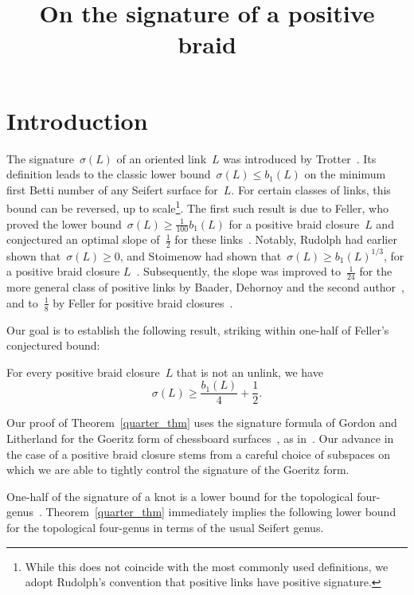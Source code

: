 \documentclass[AHL,Unicode,longabstracts,published]{cedram}
\title[On the signature of a positive braid]{On the signature of a positive braid}
\author[\initial{J. E.} \lastname{Greene}]{\firstname{Joshua Evan} \lastname{Greene}}
\author[\initial{L.} \lastname{Liechti}]{\firstname{Livio} \lastname{Liechti}}
\begin{document}
\maketitle

\section{Introduction}

The signature~$\sigma(L)$ of an oriented link~$L$ was introduced by Trotter~\cite{Trotter}. Its definition leads to the classic lower bound~$\sigma(L) \le b_1(L)$ on the minimum first Betti number of any Seifert surface for~$L$. For certain classes of links, this bound can be reversed, up to scale\footnote{While this does not coincide with the most commonly used definitions, we adopt Rudolph's convention that positive links have positive signature.}. The first such result is due to Feller, who proved the lower bound~$\sigma(L) \ge \frac{1}{100} b_1(L)$ for a positive braid closure~$L$ and conjectured an optimal slope of~$\frac12$ for these links~\cite{Peschito}. Notably, Rudolph had earlier shown that~$\sigma(L) \ge 0$, and Stoimenow had shown that~$\sigma(L) \ge b_1(L)^{1/3}$, for a positive braid closure $L$~\cite{Rudolph,Stoimenow}. Subsequently, the slope was improved to~$\frac{1}{24}$ for the more general class of positive links by Baader, Dehornoy and the second author~\cite{BDL}, and to~$\frac18$ by Feller for positive braid closures~\cite{Pegascito}.


Our goal is to establish the following result, striking within one-half of Feller's conjectured bound:

\begin{theo}\label{quarter_thm}
For every positive braid closure~$L$ that is not an unlink, we have
\[
\sigma(L)\ge \frac{b_1(L)}{4}+\frac{1}{2}.
\]
\end{theo}

Our proof of Theorem~\ref{quarter_thm} uses the signature formula of Gordon and Litherland for the Goeritz form of chessboard surfaces~\cite{GL}, as in~\cite{BDL,Pegascito}. Our advance in the case of a positive braid closure stems from a careful choice of subspaces on which we are able to tightly control the signature of the Goeritz form.


One-half of the signature of a knot is a lower bound for the topological four-genus~\cite{KT, Murasugi}. Theorem~\ref{quarter_thm} immediately implies the following lower bound for the topological four-genus in terms of the usual Seifert genus.
\end{document}
